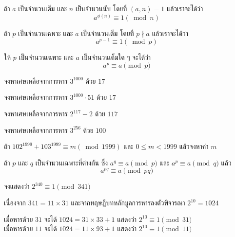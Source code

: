 \begin{theorembox}
	ถ้า $a$ เป็นจำนวนเต็ม และ $n$ เป็นจำนวนนับ โดยที่ $(a,n)=1$ แล้วเราจะได้ว่า
	\[a^{\phi(n)}\equiv 1(\bmod n)\]
\end{theorembox}

\begin{theorembox}
	ถ้า $p$ เป็นจำนวนเฉพาะ และ $a$ เป็นจำนวนเต็ม โดยที่ $p \nmid a$ แล้วเราจะได้ว่า
	\[a^{p-1}\equiv 1(\bmod p)\]
\end{theorembox}

\begin{corollarybox}
	ให้ $p$ เป็นจำนวนเฉพาะ และ $a$ เป็นจำนวนเต็มใด ๆ จะได้ว่า 
	\[ a^p \equiv a \pmod{p} \]
\end{corollarybox}

\begin{examplebox}
	จงหาเศษเหลือจากการหาร $3^{1000}$ ด้วย $17$ 
\end{examplebox}
\solution
\newpage


\begin{examplebox}
	จงหาเศษเหลือจากการหาร $3^{1000}\cdot 51$ ด้วย $17$
\end{examplebox}
\solution
\newpage

\begin{examplebox}
	จงหาเศษเหลือจากการหาร $2^{117}-2$ ด้วย $117$
\end{examplebox}
\solution
\newpage

\begin{examplebox}
	จงหาเศษเหลือจากการหาร $3^{256}$ ด้วย $100$
\end{examplebox}
\solution
\newpage

\begin{examplebox}
	ถ้า $102^{1999}+103^{1999}\equiv m(\bmod 1999)$ และ $0\leq m <1999$ แล้วจงหาค่า $m$
\end{examplebox}
\solution
\newpage
\begin{theorembox} \label{theorem3.17}
	ถ้า $p$ และ $q$ เป็นจำนวนเฉพาะที่ต่างกัน ซึ่ง $a^q \equiv a \pmod{p}$ และ $a^p \equiv a \pmod{q}$ แล้ว 
	\[ a^{pq} \equiv a \pmod{pq} \]
\end{theorembox}

\begin{examplebox}
	จงแสดงว่า $2^{340} \equiv 1 \pmod{341}$ 
\end{examplebox}
	\solution เนื่องจาก $341 = 11 \times 31$ และจากทฤษฎีบทหลักมูลการหารลงตัวพิจารณา $2^{10} = 1024$ 

เมื่อหารด้วย $31$ จะได้ $1024 = 31 \times 33 + 1$ แสดงว่า $2^{10} \equiv 1 \pmod{31}$ \\
เมื่อหารด้วย $11$ จะได้ $1024 = 11 \times 93 + 1$ แสดงว่า $2^{10} \equiv 1 \pmod{11}$

